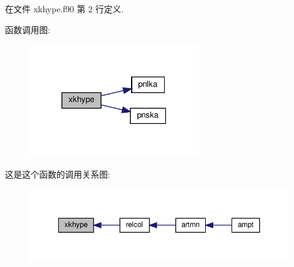在文件 xkhype.\+f90 第 2 行定义.

函数调用图\+:
\nopagebreak
\begin{figure}[H]
\begin{center}
\leavevmode
\includegraphics[width=207pt]{xkhype_8f90_af8397e9564a0a14c6015e200025d75db_cgraph}
\end{center}
\end{figure}
这是这个函数的调用关系图\+:
\nopagebreak
\begin{figure}[H]
\begin{center}
\leavevmode
\includegraphics[width=350pt]{xkhype_8f90_af8397e9564a0a14c6015e200025d75db_icgraph}
\end{center}
\end{figure}
